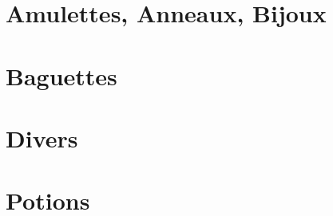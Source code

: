 \documentclass{dd}
\begin{document}
\section{Amulettes, Anneaux, Bijoux} \label{OMbijoux}

%
%

\section{Baguettes} \label{OMbaguettes}


\section{Divers} \label{OMdivers}
%

\section{Potions} \label{potions}






 















 






\end{document}
